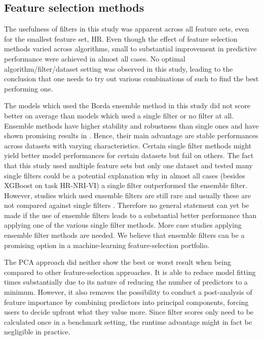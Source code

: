 \documentclass[letterpaper, peerreview, draftcls]{IEEEtran}
\begin{document}
\subsection{Feature selection methods}

The usefulness of filters in this study was apparent across all feature sets, even for the smallest feature set, HR.
Even though the effect of feature selection methods varied across algorithms, small to substantial improvement in predictive performance were achieved in almost all cases.
No optimal algorithm/filter/dataset setting was observed in this study, leading to the conclusion that one needs to try out various combinations of such to find the best performing one.

The models which used the Borda ensemble method in this study did not score better on average than models which used a single filter or no filter at all.
Ensemble methods have higher stability and robustness than single ones and have shown promising results in \cite{drotar2017a}.
Hence, their main advantage are stable performances across datasets with varying characteristics.
Certain single filter methods might yield better model performances for certain datasets but fail on others.
The fact that this study used multiple feature sets but only one dataset and tested many single filters could be a potential explanation why in almost all cases (besides XGBoost on task HR-NRI-VI) a single filter outperformed the ensemble filter.
However, studies which used ensemble filters are still rare and usually these are not compared against single filters \cite{ghosh2019}.
Therefore no general statement can yet be made if the use of ensemble filters leads to a substantial better performance than applying one of the various single filter methods.
More case studies applying ensemble filter methods are needed.
We believe that ensemble filters can be a promising option in a machine-learning feature-selection portfolio.

The PCA approach did neither show the best or worst result when being compared to other feature-selection approaches.
It is able to reduce model fitting times substantially due to its nature of reducing the number of predictors to a minimum.
However, it also removes the possibility to conduct a post-analysis of feature importance by combining predictors into principal components, forcing users to decide upfront what they value more.
Since filter scores only need to be calculated once in a benchmark setting, the runtime advantage might in fact be negligible in practice.
\end{document}
